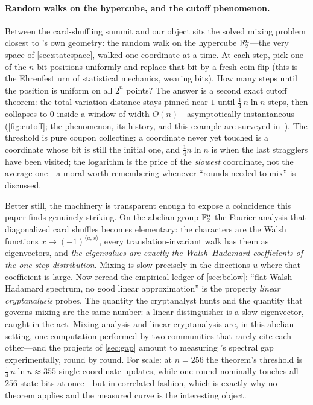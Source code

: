 \paragraph{Random walks on the hypercube, and the cutoff phenomenon.}
Between the card-shuffling summit and our object sits the solved mixing
problem closest to \SHA{}'s own geometry: the random walk on the
hypercube $\mathbb{F}_2^n$---the very space of \cref{sec:statespace}, walked
one coordinate at a time. At each step, pick one of the $n$ bit
positions uniformly and replace that bit by a fresh coin flip (this is
the Ehrenfest urn of statistical mechanics, wearing bits). How many
steps until the position is uniform on all $2^n$ points? The answer is
a second exact cutoff theorem: the total-variation distance stays
pinned near $1$ until $\tfrac14\, n \ln n$ steps, then collapses to $0$
inside a window of width $O(n)$---asymptotically instantaneous
(\cref{fig:cutoff}; the phenomenon, its history, and this example are
surveyed in~\citealp{Diaconis1996}). The threshold is pure coupon
collecting: a coordinate never yet touched is a coordinate whose bit is
still the initial one, and $\tfrac14 n \ln n$ is when the last
stragglers have been visited; the logarithm is the price of the
\emph{slowest} coordinate, not the average one---a moral worth
remembering whenever ``rounds needed to mix'' is discussed.

Better still, the machinery is transparent enough to expose a
coincidence this paper finds genuinely striking. On the abelian group
$\mathbb{F}_2^n$ the Fourier analysis that diagonalized card shuffles becomes
elementary: the characters are the Walsh functions
$x \mapsto (-1)^{\langle u, x\rangle}$, every translation-invariant
walk has them as eigenvectors, and \emph{the eigenvalues are exactly
the Walsh--Hadamard coefficients of the one-step distribution}. Mixing
is slow precisely in the directions $u$ where that coefficient is
large. Now reread the empirical ledger of \cref{sec:below}: ``flat
Walsh--Hadamard spectrum, no good linear approximation'' is the
property \emph{linear cryptanalysis} probes. The quantity the
cryptanalyst hunts and the quantity that governs mixing are the same
number: a linear distinguisher is a slow eigenvector, caught in the
act. Mixing analysis and linear cryptanalysis are, in this abelian
setting, one computation performed by two communities that rarely cite
each other---and the projects of \cref{sec:gap} amount to measuring
\SHA{}'s spectral gap experimentally, round by round. For scale: at
$n = 256$ the theorem's threshold is $\tfrac14\, n \ln n \approx 355$
single-coordinate updates, while one \SHA{} round nominally touches all
$256$ state bits at once---but in correlated fashion, which is exactly
why no theorem applies and the measured curve is the interesting
object.

